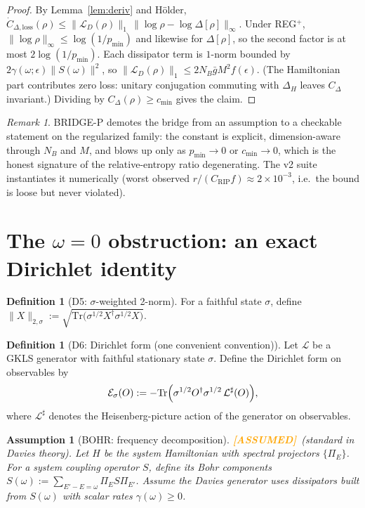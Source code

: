 \documentclass[11pt]{article}
\newtheorem{assumption}[theorem]{Assumption}
\theoremstyle{definition}
\newtheorem{definition}[theorem]{Definition}
\theoremstyle{remark}
\newtheorem{remark}[theorem]{Remark}
\newcommand{\ASSUMED}{\textcolor{orange}{\textbf{[ASSUMED]}}}
\begin{document}
\begin{proof}
By Lemma~\ref{lem:deriv} and H\"older,
$\dot{C}_{\Delta,\mathrm{loss}}(\rho) \le
\|\mathcal{L}_D(\rho)\|_1\, \|\log\rho - \log\Delta[\rho]\|_\infty$.
Under REG$^{+}$, $\|\log\rho\|_\infty \le \log(1/p_{\min})$ and likewise
for $\Delta[\rho]$, so the second factor is at most
$2\log(1/p_{\min})$. Each dissipator term is $1$-norm bounded by
$2\gamma(\omega;\epsilon)\|S(\omega)\|^2$, so
$\|\mathcal{L}_D(\rho)\|_1 \le 2 N_B \bar{g} M^2 f(\epsilon)$.
(The Hamiltonian part contributes zero loss: unitary conjugation
commuting with $\Delta_H$ leaves $C_\Delta$ invariant.) Dividing by
$C_\Delta(\rho) \ge c_{\min}$ gives the claim.
\end{proof}

\begin{remark}
\label{rem:bridgep}
BRIDGE-P demotes the bridge from an assumption to a checkable statement
on the regularized family: the constant is explicit, dimension-aware
through $N_B$ and $M$, and blows up only as $p_{\min} \to 0$ or
$c_{\min} \to 0$, which is the honest signature of the relative-entropy
ratio degenerating. The v2 suite instantiates it numerically (worst
observed $r / (C_{\mathrm{RIP}} f) \approx 2\times 10^{-3}$, i.e.\ the
bound is loose but never violated).
\end{remark}

\section{The $\omega = 0$ obstruction: an exact Dirichlet identity}

\begin{definition}[D5: $\sigma$-weighted 2-norm]
\label{def:kmsnorm}
For a faithful state $\sigma$, define $\|X\|_{2,\sigma} :=
\sqrt{\mathrm{Tr}\bigl(\sigma^{1/2}X^{\dagger}\sigma^{1/2}X\bigr)}$.
\end{definition}

\begin{definition}[D6: Dirichlet form (one convenient convention)]
\label{def:dirichlet}
Let $\mathcal{L}$ be a GKLS generator with faithful stationary state
$\sigma$. Define the Dirichlet form on observables by
\[
\mathcal{E}_\sigma(O) := -\mathrm{Tr}\Bigl(\sigma^{1/2}O^{\dagger}
\sigma^{1/2}\, \mathcal{L}^{\sharp}(O)\Bigr),
\]
where $\mathcal{L}^{\sharp}$ denotes the Heisenberg-picture action of the
generator on observables.
\end{definition}

\begin{assumption}[BOHR: frequency decomposition]
\label{ass:bohr}
\ASSUMED\ (standard in Davies theory). Let $H$ be the system Hamiltonian
with spectral projectors $\{\Pi_E\}$. For a system coupling operator $S$,
define its Bohr components $S(\omega) := \sum_{E'-E=\omega} \Pi_E S
\Pi_{E'}$. Assume the Davies generator uses dissipators built from
$S(\omega)$ with scalar rates $\gamma(\omega) \ge 0$.
\end{assumption}
\end{document}
